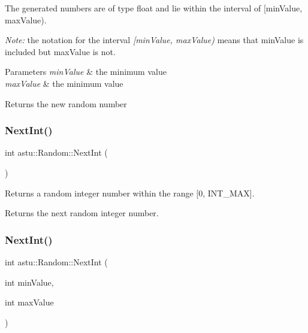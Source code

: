 The generated numbers are of type {\ttfamily float} and lie within the interval of \mbox{[}min\+Value, max\+Value).

{\itshape Note\+:} the notation for the interval {\itshape \mbox{[}min\+Value, max\+Value)} means that {\ttfamily min\+Value} is included but {\ttfamily max\+Value} is not.


\begin{DoxyParams}{Parameters}
{\em min\+Value} & the minimum value \\
\hline
{\em max\+Value} & the minimum value \\
\hline
\end{DoxyParams}
\begin{DoxyReturn}{Returns}
the new random number 
\end{DoxyReturn}
\mbox{\label{classastu_1_1Random_ae45b2a5f53c1ecc833a6144af345d2fb}} 
\subsubsection{\texorpdfstring{Next\+Int()}{NextInt()}\hspace{0.1cm}{\footnotesize\ttfamily [1/2]}}
{\footnotesize\ttfamily int astu\+::\+Random\+::\+Next\+Int (\begin{DoxyParamCaption}{ }\end{DoxyParamCaption})}

Returns a random integer number within the range \mbox{[}0, I\+N\+T\+\_\+\+M\+AX\mbox{]}.

\begin{DoxyReturn}{Returns}
the next random integer number. 
\end{DoxyReturn}
\mbox{\label{classastu_1_1Random_a92a532121f8edfb954b548c3c74a6a9c}} 
\subsubsection{\texorpdfstring{Next\+Int()}{NextInt()}\hspace{0.1cm}{\footnotesize\ttfamily [2/2]}}
{\footnotesize\ttfamily int astu\+::\+Random\+::\+Next\+Int (\begin{DoxyParamCaption}\item[{int}]{min\+Value,  }\item[{int}]{max\+Value }\end{DoxyParamCaption})}

